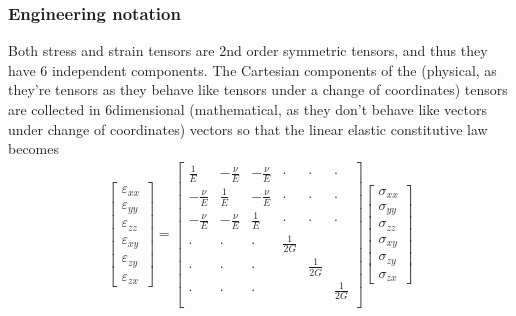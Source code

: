 \documentclass[letterpaper,10pt,english]{jupyterBook}
\begin{document}
\subsubsection{Engineering notation}
\label{\detokenize{ch/solids/plates-shells/stress-strain-state:engineering-notation}}\label{\detokenize{ch/solids/plates-shells/stress-strain-state:solid-mechanics-small-displacements-plates-shells-stress-strain-state-linear-elastic-engineering}}
\sphinxAtStartPar
Both stress and strain tensors are 2\sphinxhyphen{}nd order symmetric tensors, and thus they have 6 independent components. The Cartesian components of the (physical, as they’re tensors as they behave like tensors under a change of coordinates) tensors are collected in \(6\)\sphinxhyphen{}dimensional (mathematical, as they don’t behave like vectors under change of coordinates) vectors so that the linear elastic constitutive law becomes
\begin{equation*}
\begin{split}
\begin{bmatrix} \varepsilon_{xx} \\ \varepsilon_{yy} \\ \varepsilon_{zz} \\ \varepsilon_{xy} \\ \varepsilon_{zy} \\ \varepsilon_{zx}  \end{bmatrix}
=
\begin{bmatrix}
 \frac{ 1 }{E} &-\frac{\nu}{E} &-\frac{\nu}{E} & \cdot & \cdot & \cdot \\
-\frac{\nu}{E} & \frac{ 1 }{E} &-\frac{\nu}{E} & \cdot & \cdot & \cdot \\
-\frac{\nu}{E} &-\frac{\nu}{E} & \frac{ 1 }{E} & \cdot & \cdot & \cdot \\
 \cdot & \cdot & \cdot & \frac{1}{2 G} & & \\
 \cdot & \cdot & \cdot & & \frac{1}{2 G} & \\
 \cdot & \cdot & \cdot & & & \frac{1}{2 G} \\
\end{bmatrix}
\begin{bmatrix} \sigma_{xx} \\ \sigma_{yy} \\ \sigma_{zz} \\ \sigma_{xy} \\ \sigma_{zy} \\ \sigma_{zx} \end{bmatrix}
\end{split}
\end{equation*}
\end{document}
